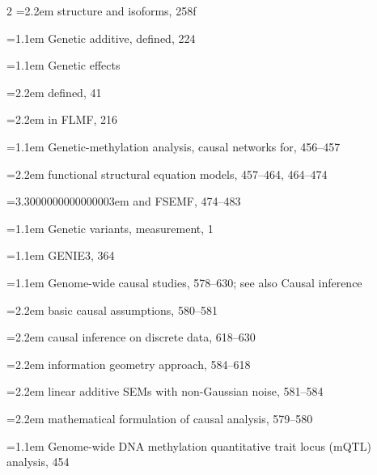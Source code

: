 \begin{multicols}{2}
\noindent\hangindent=2.2em \hspace*{1.1em}structure and isoforms, 258f\par
\noindent\hangindent=1.1em Genetic additive, defined, 224\par
\noindent\hangindent=1.1em Genetic effects\par
\noindent\hangindent=2.2em \hspace*{1.1em}defined, 41\par
\noindent\hangindent=2.2em \hspace*{1.1em}in FLMF, 216\par
\noindent\hangindent=1.1em Genetic-methylation analysis, causal networks for, 456--457\par
\noindent\hangindent=2.2em \hspace*{1.1em}functional structural equation models, 457--464, 464--474\par
\noindent\hangindent=3.3000000000000003em \hspace*{2.2em}and FSEMF, 474--483\par
\noindent\hangindent=1.1em Genetic variants, measurement, 1\par
\noindent\hangindent=1.1em GENIE3, 364\par
\noindent\hangindent=1.1em Genome-wide causal studies, 578--630; see also Causal inference\par
\noindent\hangindent=2.2em \hspace*{1.1em}basic causal assumptions, 580--581\par
\noindent\hangindent=2.2em \hspace*{1.1em}causal inference on discrete data, 618--630\par
\noindent\hangindent=2.2em \hspace*{1.1em}information geometry approach, 584--618\par
\noindent\hangindent=2.2em \hspace*{1.1em}linear additive SEMs with non-Gaussian noise, 581--584\par
\noindent\hangindent=2.2em \hspace*{1.1em}mathematical formulation of causal analysis, 579--580\par
\noindent\hangindent=1.1em Genome-wide DNA methylation quantitative trait locus (mQTL) analysis, 454\par

\end{multicols}
